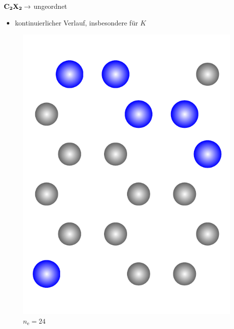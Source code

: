 \documentclass{beamer}
\def \nE {n_\mathrm{e}}
\begin{document}
\begin{frame}{$\bf C_{\boldsymbol 2}X_{\boldsymbol 2} \rightarrow$ ungeordnet}
\begin{itemize}
			\item kontinuierlicher Verlauf, insbesondere für $K$
		\end{itemize}
		\begin{figure}
			\scriptsize
			\begin{minipage}[b]{0.19\textwidth}
				\centering
				\includegraphics[height=1.1\textwidth]{Abbildungen/1.pdf} \\
				$\nE = 24$
			\end{minipage}
			\hfill
			\begin{minipage}[b]{0.19\textwidth}
				\centering

\end{minipage}
\end{figure}
\end{frame}
\end{document}

